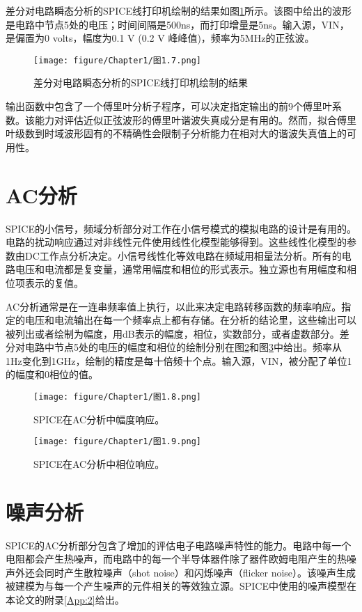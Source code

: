 差分对电路瞬态分析的SPICE线打印机绘制的结果如图\ref{图1.7}所示。该图中给出的波形是电路中节点5处的电压；时间间隔是500ns，而打印增量是5ns。输入源，VIN，是偏置为0 volts，幅度为0.1 V (0.2 V 峰峰值)，频率为5MHz的正弦波。

\begin{figure}[htbp]
\small
    \centering
    \texttt{[image: figure/Chapter1/图1.7.png]}
    \caption{差分对电路瞬态分析的SPICE线打印机绘制的结果}
    \label{图1.7}
\end{figure}

输出函数中包含了一个傅里叶分析子程序，可以决定指定输出的前9个傅里叶系数。该能力对评估近似正弦波形的傅里叶谐波失真成分是有用的。然而，拟合傅里叶级数到时域波形固有的不精确性会限制子分析能力在相对大的谐波失真值上的可用性。

\section{AC分析}
SPICE的小信号，频域分析部分对工作在小信号模式的模拟电路的设计是有用的。电路的扰动响应通过对非线性元件使用线性化模型能够得到。这些线性化模型的参数由DC工作点分析决定。小信号线性化等效电路在频域用相量法分析\cite{ref-7}。所有的电路电压和电流都是复变量，通常用幅度和相位的形式表示。独立源也有用幅度和相位项表示的复值。

AC分析通常是在一连串频率值上执行，以此来决定电路转移函数的频率响应。指定的电压和电流输出在每一个频率点上都有存储。在分析的结论里，这些输出可以被列出或者绘制为幅度，用dB表示的幅度，相位，实数部分，或者虚数部分。差分对电路中节点5处的电压的幅度和相位的绘制分别在图\ref{图1.8}和图\ref{图1.9}中给出。频率从1Hz变化到1GHz，绘制的精度是每十倍频十个点。输入源，VIN，被分配了单位1的幅度和0相位的值。

\begin{figure}[htbp]
\small
    \centering
    \texttt{[image: figure/Chapter1/图1.8.png]}
    \caption{SPICE在AC分析中幅度响应。}
    \label{图1.8}
\end{figure}

\begin{figure}[htbp]
\small
    \centering
    \texttt{[image: figure/Chapter1/图1.9.png]}
    \caption{SPICE在AC分析中相位响应。}
    \label{图1.9}
\end{figure}

\section{噪声分析}
SPICE的AC分析部分包含了增加的评估电子电路噪声特性的能力\cite{ref-3,ref-8,ref-9}。电路中每一个电阻都会产生热噪声，而电路中的每一个半导体器件除了器件欧姆电阻产生的热噪声外还会同时产生散粒噪声（shot noise）和闪烁噪声（flicker noise）。该噪声生成被建模为与每一个产生噪声的元件相关的等效独立源。SPICE中使用的噪声模型在本论文的附录\ref{App:2}给出。

